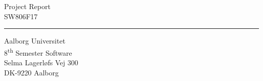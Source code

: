 \begin{titlepage}
\begin{minipage}{0.4\linewidth}
\begin{flushleft}
        \end{flushleft}
    \end{minipage}
    \hfill
    \begin{minipage}{0.2\linewidth}
        \begin{flushright}
        \smallfont
        Project Report\\ \vspace{0.1cm}
        SW806F17
        \end{flushright}
    \end{minipage}
    \begin{minipage}{0.02\linewidth}
        \centering
        \rule{1pt}{90pt}
    \end{minipage}
    \begin{minipage}{0.3\linewidth}
        \begin{flushleft}
            \smallfont
            Aalborg Universitet\\
            8\textsuperscript{th} Semester Software\\ \vspace{0.1cm}
            Selma Lagerløfs Vej 300\\
            DK-9220 Aalborg
        \end{flushleft}
    \end{minipage}
\end{titlepage}
\restoregeometry
\clearpage
\cleardoublepage
